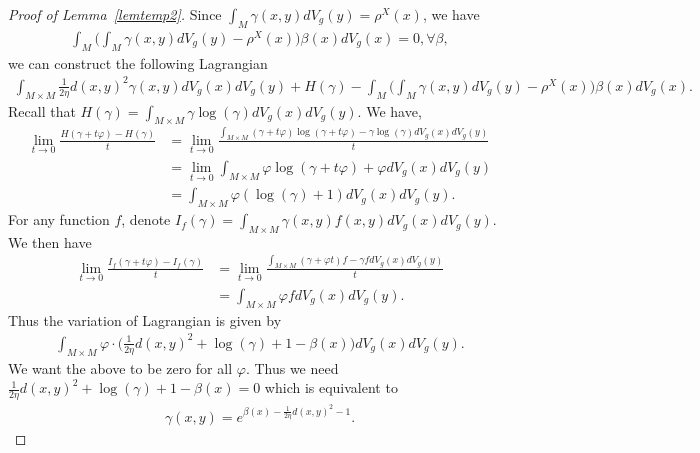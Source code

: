 \begin{proof}[Proof of Lemma~\ref{lemtemp2}]
    Since $\int_{M} \gamma(x, y) dV_{g}(y) = \rho^{X}(x)$, we have 
    \begin{align*}
        \int_{M} \Big( \int_{M} \gamma(x, y) dV_{g}(y) - \rho^{X}(x) \Big) \beta(x) dV_{g}(x) = 0, \forall \beta,
    \end{align*}
    we can construct the following Lagrangian
    \begin{align*}
        \int_{M \times M}\frac{1}{2\eta} d(x, y)^{2} \gamma (x, y) dV_{g}(x) dV_{g}(y)
        + H(\gamma) - \int_{M} \Big( \int_{M} \gamma(x, y) dV_{g}(y) - \rho^{X}(x) \Big) \beta(x) dV_{g}(x).
   \end{align*}
    Recall that $H(\gamma) = \int_{M \times M} \gamma \log(\gamma) dV_{g}(x) dV_{g}(y) $. We have,
    \begin{align*}
            \lim_{t \to 0} \frac{H(\gamma + t \varphi) - H(\gamma)}{t}
            &= \lim_{t \to 0} \frac{\int_{M \times M} (\gamma + t \varphi) \log(\gamma + t \varphi) - \gamma \log(\gamma) dV_{g}(x) dV_{g}(y) }{t} \\
            &= \lim_{t \to 0} \int_{M \times M} \varphi \log(\gamma + t \varphi) + \varphi dV_{g}(x) dV_{g}(y) \\
            &= \int_{M \times M} \varphi (\log(\gamma) + 1)  dV_{g}(x) dV_{g}(y).
    \end{align*}
For any function $f$, denote $I_{f}(\gamma) = \int_{M \times M} \gamma(x, y) f(x, y) dV_{g}(x) dV_{g}(y)$. We then have 
    \begin{align*}
        \lim_{t \to 0} \frac{I_{f}(\gamma + t \varphi) - I_{f}(\gamma)}{t}
        &= \lim_{t \to 0} \frac{\int_{M \times M} (\gamma + \varphi t)f - \gamma f dV_{g}(x) dV_{g}(y)}{t}\\
        &= \int_{M \times M} \varphi f dV_{g}(x) dV_{g}(y).
    \end{align*}
    Thus the variation of Lagrangian is given by
    \begin{align*}
        \int_{M \times M} \varphi \cdot \Big(\frac{1}{2\eta} d(x, y)^{2} + \log(\gamma) + 1 - \beta(x) \Big) dV_{g}(x) dV_{g}(y).
    \end{align*}
    We want the above to be zero for all $\varphi$. 
    Thus we need $\frac{1}{2\eta} d(x, y)^{2} + \log(\gamma) + 1 - \beta(x) = 0$ 
    which is equivalent to 
    \begin{align*}
        \gamma(x, y) = e^{\beta(x) - \frac{1}{2\eta} d(x, y)^{2} - 1}.
    \end{align*}

\end{proof}
